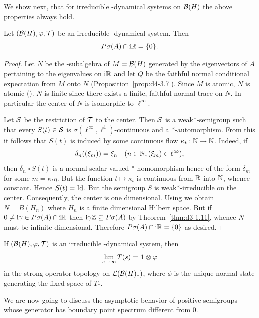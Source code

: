 We show next, that for irreducible \WA-dynamical systems on $ \mathcal{B}(H) $  the above properties always hold.
\begin{theorem}\label{thm:d4-3.8}
Let $ (\BH,\phi,\TT) $  be an irreducible \WA-dynamical system.
Then
\[
P\sigma(A) \cap \mathrm{i}\mathbb{R} = \{0\} .
\]

\end{theorem}
\begin{proof}
Let $ N $  be the \WA-subalgebra of\/ $ M = \mathcal{B}(H) $  generated by the eigenvectors of\/ $ A $  pertaining to the eigenvalues on $ \mathrm{i}\mathbb{R} $  and let $ Q $  be the faithful normal conditional expectation from $ M $  onto $ N $  (Proposition~\ref{prop:d4-3.7}).
Since $ M $  is atomic, $ N $  is atomic (\textcite{stormer:1972}).
$ N $  is finite since there exists a finite, faithful normal trace on $ N $.
In particular the center of\/ $ N $  is isomorphic to $ \ell^{\infty} $.

Let $ \mathcal{S} $  be the restriction of\/ $ \mathcal{T} $  to the center.
Then $ \mathcal{S} $  is a weak*-semigroup such that every $ S(t) \in \mathcal{S} $  is $ \sigma(\ell^{\infty},\ell^{1}) $-continuous and a *-automorphism.
From this it follows that $ S(t) $  is induced by some continuous flow $ \kappa_{t}: \mathbb{N} \to \mathbb{N} $.
Indeed, if\/ 
\[ 
\delta_{n}((\xi_{m})) = \xi_{n} \quad (n \in \mathbb{N}, (\xi_{m}) \in \ell^{\infty}),
\]
then $ \delta_{n} \circ S(t) $  is a normal scalar valued *-homomorphism hence of the form $ \delta_{m} $  for some $ m = \kappa_{t}\eta $.
But the function $ t \mapsto \kappa_{t} $  is continuous from $ \mathbb{R} $  into $ \mathbb{N} $, whence constant.
Hence $ S(t) = \operatorname{Id} $.
But the semigroup $ S $  is weak*-irreducible on the center.
Consequently, the center is one dimensional.
Using \textcite[Theorem V.1.27]{takesaki:1979} we obtain $ N = B(H_{n}) $  where $ H_{n} $  is a finite dimensional Hilbert space.
But if\/ $ 0 \neq \mathrm{i}\gamma \in P\sigma(A) \cap \mathrm{i}\mathbb{R} $  then $ \mathrm{i}\gamma\mathbb{Z} \subseteq P\sigma(A) $  by Theorem~\ref{thm:d3-1.11}, whence $ N $  must be infinite dimensional.
Therefore $ P\sigma(A) \cap \mathrm{i}\mathbb{R} = \{0\} $  as desired.
\end{proof}
\begin{corollary}\label{cor:d4-3.9}
If\/ $ (\BH,\phi,\TT) $  is an irreducible \WA-dynamical system, then
\[
	\lim_{s \to \infty} T(s) = \1 \otimes \phi
\]
in the strong operator topology on $ \mathcal{L}(\mathcal{B}(H)_{*}) $, where $ \phi $  is the unique normal state generating the fixed space of\/ $ T_{*} $.
\end{corollary}
We are now going to discuss the asymptotic behavior of positive semigroups whose generator has boundary point spectrum different from $ 0 $.
